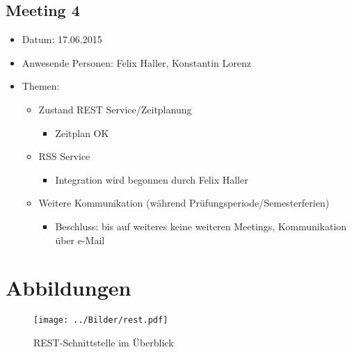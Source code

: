 \documentclass[12pt]{scrartcl}
\begin{document}
		\subsection{Meeting 4}
		\begin{itemize}
			\item Datum: 17.06.2015
			\item Anwesende Personen: Felix Haller, Konstantin Lorenz
			\item Themen:
			\begin{itemize}
				\item Zustand REST Service/Zeitplanung
				\begin{itemize}
					\item Zeitplan OK
				\end{itemize}
				\item RSS Service
				\begin{itemize}
					\item Integration wird begonnen durch Felix Haller
				\end{itemize}
				\item Weitere Kommunikation (während Prüfungsperiode/Semesterferien)
				\begin{itemize}
					\item Beschluss: bis auf weiteres keine weiteren Meetings, Kommunikation über e-Mail
				\end{itemize}
			\end{itemize}
		\end{itemize}
		\section{Abbildungen}
			\begin{landscape}
			 \begin{figure}
			  \centering
			  \texttt{[image: ../Bilder/rest.pdf]} 
			  \caption{REST-Schnittstelle im Überblick}
			  \label{fig:rest}
			 \end{figure}
			\end{landscape}
		
\end{document}
